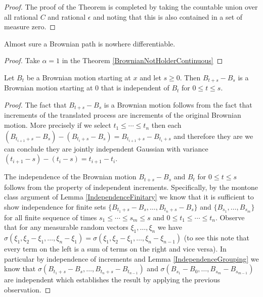 \begin{proof}
The proof of the Theorem is completed by taking the countable union 
over all rational $C$ and rational $\epsilon$ and noting that this is
also contained in a set of measure zero.
\end{proof}

\begin{cor}Almost sure a
  Brownian path is nowhere differentiable.  
\end{cor}
\begin{proof}Take $\alpha = 1$ in the Theorem \ref{BrownianNotHolderContinuous}
\end{proof}

\begin{thm}\label{BrownianMarkovProperty}Let $B_t$ be a Brownian motion starting at $x$ and let $s
  \geq 0$.  Then $B_{t+s} - B_s$ is a Brownian motion starting at $0$
  that is independent of $B_t$ for $0 \leq t \leq s$.
\end{thm}
\begin{proof}
The fact that $B_{t+s} - B_s$ is a Brownian motion follows from the
fact that increments of the translated process are increments of the
original Brownian motion.  More precisely if we select $t_1 \leq
\cdots \leq t_n$ then each $(B_{t_{i+1}+s} - B_s) - (B_{t_{i}+s} -
B_s) = B_{t_{i+1}+s} - B_{t_i + s}$ and therefore they are we can
conclude they are jointly independent Gaussian with variance $(t_{i+1}
- s) - (t_i - s) = t_{i+1} - t_i$.

The independence of the Brownian motion $B_{t+s} - B_s$ and $B_t$ for
$0 \leq t \leq s$ follows from the property of independent
increments.  Specifically, by the montone class argument of Lemma \ref{IndependenceFinitary} we know that it is sufficient
to show independence for finite sets $\lbrace B_{{t_1}+s} - B_s,
\dots ,B_{{t_n}+s} - B_s \rbrace$ and $\lbrace B_{s_1}, \dots,
B_{s_m}\rbrace$ for all finite sequence of times $s_1 \leq \cdots \leq s_m \leq s$ and $0 \leq t_1 \leq \cdots \leq
t_n$.  Observe that for any measurable random vectors $\xi_1, \dots ,
\xi_n$ we have $\sigma(\xi_1, \xi_2 - \xi_1, \dots,\xi_n - \xi_1) =
\sigma(\xi_1, \xi_2 - \xi_1, \dots,\xi_n - \xi_{n-1})$ (to see this
note that every term on the left is a sum of terms on the right and
vice versa).  In particular by independence of increments and Lemma
\ref{IndependenceGrouping} we know that $\sigma(B_{{t_1}+s} - B_s,
\dots ,B_{{t_n}+s} - B_{t_{n-1}})$ and $\sigma( B_{s_1} - B_0, \dots,
B_{s_m} - B_{s_{m-1}})$ are independent
which establishes the result by applying the previous observation.
\end{proof}

